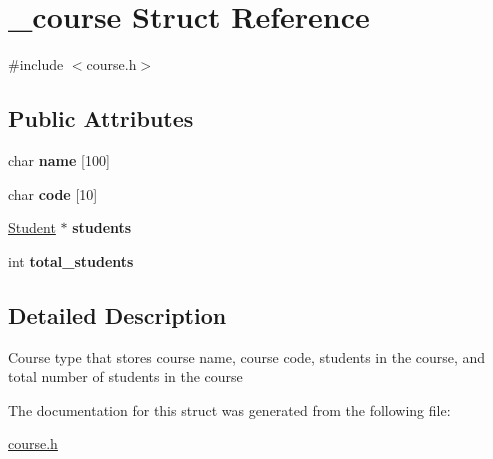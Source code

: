 \hypertarget{struct__course}{}\section{\+\_\+course Struct Reference}
\label{struct__course}


{\ttfamily \#include $<$course.\+h$>$}

\subsection*{Public Attributes}
\begin{DoxyCompactItemize}
\item 
\mbox{\label{struct__course_a8a6f7d2171f18b5d13e86913345f381d}} 
char {\bfseries name} \mbox{[}100\mbox{]}
\item 
\mbox{\label{struct__course_ae86dc46bc4dfe126555e5560860b583f}} 
char {\bfseries code} \mbox{[}10\mbox{]}
\item 
\mbox{\label{struct__course_a5cf448bc80f0f8c5f23402db23d41a00}} 
\mbox{\hyperlink{student_8h_abcfb362c0eb3182c835992cf3d0c0dd3}{Student}} $\ast$ {\bfseries students}
\item 
\mbox{\label{struct__course_afd5e161f7cf358c13cc8aa868b462006}} 
int {\bfseries total\+\_\+students}
\end{DoxyCompactItemize}


\subsection{Detailed Description}
Course type that stores course name, course code, students in the course, and total number of students in the course 

The documentation for this struct was generated from the following file\+:\begin{DoxyCompactItemize}
\item 
\mbox{\hyperlink{course_8h}{course.\+h}}\end{DoxyCompactItemize}
